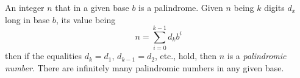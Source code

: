 \documentclass[12pt]{article}
\begin{document}
An integer $n$ that in a given base $b$ is a palindrome. Given $n$ being $k$ digits $d_x$ long in base $b$, its value being $$n = \sum_{i = 0}^{k - 1} d_kb^i$$ then if the equalities $d_k = d_1$, $d_{k - 1} = d_2$, etc., hold, then $n$ is a {\em palindromic number}. There are infinitely many palindromic numbers in any given base.
\end{document}
